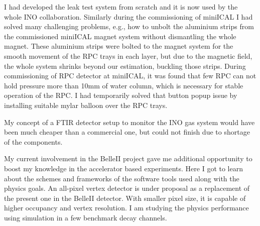 \documentclass[12pt]{article}
\begin{document}
\begin{minipage}{1.05\textwidth}
\hspace{0.5cm}
I had developed the leak test system from scratch and it is now
used by the whole INO collaboration. Similarly during the
commissioning of miniICAL I had solved many challenging problems,
e.g., how to unbolt the aluminium strips from the commissioned
miniICAL magnet system without dismantling the whole magnet.
These aluminium strips were bolted to the
magnet system for the smooth movement of the RPC trays in each layer,
but due to the magnetic field, the whole system shrinks beyond our
estimation, buckling those strips.
During commissioning of RPC detector at miniICAL, it was found that
few RPC can not hold pressure more than 10mm of water column, which is
necessary for stable operation of the RPC. I had temporarily
solved that button popup issue by installing suitable mylar balloon
over the RPC trays.

\hspace{0.5cm}
My concept of a FTIR detector setup to
monitor the INO gas system would have been much cheaper than a
commercial one, but could not finish due to shortage of the components.


\hspace{0.5cm}
My current involvement in the BelleII project gave me additional
opportunity to boost my knowledge in the accelerator based experiments.
Here I got to learn about the schemes and frameworks of the software tools
used along with the physics goals.
An all-pixel vertex detector is under proposal as a replacement of
the present one in the BelleII detector. With smaller pixel size, it is
capable of higher occupancy and vertex resolution.
I am studying the physics performance using simulation in a
few benchmark decay channels.

\end{minipage}
\end{document}
